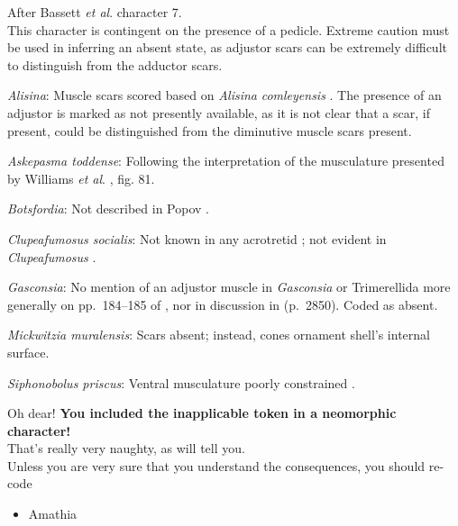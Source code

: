 \documentclass[openany]{book}
\providecommand{\tightlist}{%
  \setlength{\itemsep}{0pt}\setlength{\parskip}{0pt}}
\theoremstyle{definition}
\theoremstyle{definition}
\theoremstyle{definition}
\theoremstyle{remark}
\begin{document}
After Bassett \emph{et al}.
\citeyearpar{Bassett2001Functionalmorphology} character 7.\\
This character is contingent on the presence of a pedicle. Extreme
caution must be used in inferring an absent state, as adjustor scars can
be extremely difficult to distinguish from the adductor scars.

\hypertarget{Alisina-coding-75}{}
\emph{Alisina}: Muscle scars scored based on \emph{Alisina}
\emph{comleyensis} \citep{Bassett2001Functionalmorphology}. The presence
of an adjustor is marked as not presently available, as it is not clear
that a scar, if present, could be distinguished from the diminutive
muscle scars present.

\hypertarget{Askepasma_toddense-coding-75}{}
\emph{Askepasma toddense}: Following the interpretation of the
musculature presented by Williams \emph{et al}.
\citeyearpar{Williams2000LinguliformeaCraniiformea}, fig. 81.

\hypertarget{Botsfordia-coding-75}{}
\emph{Botsfordia}: Not described in Popov
\citeyearpar{Popov1992TheCambrian}.

\hypertarget{Clupeafumosus_socialis-coding-75}{}
\emph{Clupeafumosus socialis}: Not known in any acrotretid
\citep{Williams2000LinguliformeaCraniiformea}; not evident in
\emph{Clupeafumosus} \citep{Topper2013Reappraisalof}.

\hypertarget{Gasconsia-coding-75}{}
\emph{Gasconsia}: No mention of an adjustor muscle in \emph{Gasconsia}
or Trimerellida more generally on pp.~184--185 of
\citet{Williams2000LinguliformeaCraniiformea}, nor in discussion in
\citet{Williams2007Supplement} (p.~2850). Coded as absent.

\hypertarget{Mickwitzia_muralensis-coding-75}{}
\emph{Mickwitzia muralensis}: Scars absent; instead, cones ornament
shell's internal surface.

\hypertarget{Siphonobolus_priscus-coding-75}{}
\emph{Siphonobolus priscus}: Ventral musculature poorly constrained
\citep{Williams2000LinguliformeaCraniiformea, Popov2009Earlyontogeny}.

Oh dear! \textbf{You included the inapplicable token in a neomorphic
character!}\\
That's really very naughty, as \citet{Brazeau2018} will tell you.\\
Unless you are very sure that you understand the consequences, you
should re-code

\begin{itemize}
\tightlist
\item
  Amathia
\end{itemize}
\end{document}
